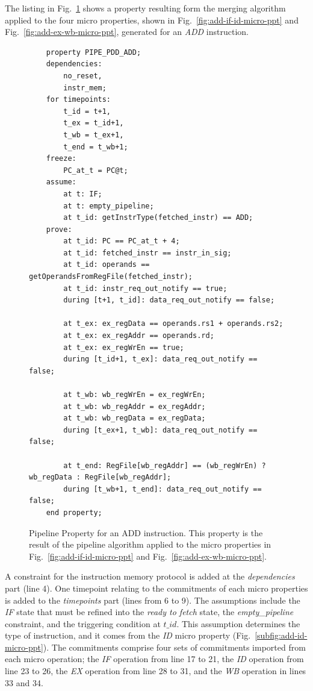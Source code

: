 The listing in Fig.~\ref{fig:add-ptt-merg-algorithm} shows a property resulting form the merging algorithm applied to the four micro properties, shown in Fig.~\ref{fig:add-if-id-micro-ppt} and Fig.~\ref{fig:add-ex-wb-micro-ppt}, generated for an \textit{ADD} instruction.

\begin{figure}[htb!]
    \begin{lstlisting}
    property PIPE_PDD_ADD;
    dependencies: 
        no_reset,
        instr_mem;
    for timepoints:
        t_id = t+1,
        t_ex = t_id+1,
        t_wb = t_ex+1,
        t_end = t_wb+1;
    freeze:
        PC_at_t = PC@t;
    assume:
        at t: IF;
        at t: empty_pipeline;
        at t_id: getInstrType(fetched_instr) == ADD;
    prove:
        at t_id: PC == PC_at_t + 4;
        at t_id: fetched_instr == instr_in_sig;
        at t_id: operands == getOperandsFromRegFile(fetched_instr);
        at t_id: instr_req_out_notify == true;
        during [t+1, t_id]: data_req_out_notify == false;
    
        at t_ex: ex_regData == operands.rs1 + operands.rs2;
        at t_ex: ex_regAddr == operands.rd;
        at t_ex: ex_regWrEn == true;
        during [t_id+1, t_ex]: data_req_out_notify == false;
    
        at t_wb: wb_regWrEn = ex_regWrEn;
        at t_wb: wb_regAddr = ex_regAddr;
        at t_wb: wb_regData = ex_regData;
        during [t_ex+1, t_wb]: data_req_out_notify == false;
    
        at t_end: RegFile[wb_regAddr] == (wb_regWrEn) ? wb_regData : RegFile[wb_regAddr];
        during [t_wb+1, t_end]: data_req_out_notify == false;
    end property;\end{lstlisting}
    \caption{Pipeline Property for an ADD instruction. This property is the result of the pipeline algorithm applied to the micro properties in Fig.~\ref{fig:add-if-id-micro-ppt} and Fig.~\ref{fig:add-ex-wb-micro-ppt}.}
    \label{fig:add-ptt-merg-algorithm}
\end{figure}

A constraint for the instruction memory protocol is added at the \textit{dependencies} part (line 4). One timepoint relating to the commitments of each micro properties is added to the \textit{timepoints} part (lines from 6 to 9). The assumptions include the \textit{IF} state that must be refined into the \textit{ready to fetch} state, the \textit{empty\_pipeline} constraint, and the triggering condition at $t\_id$. This assumption determines the type of instruction, and it comes from the \textit{ID} micro property (Fig.~\ref{subfig:add-id-micro-ppt}). The commitments comprise four sets of commitments imported from each micro operation; the \textit{IF} operation from line 17 to 21, the \textit{ID} operation from line 23 to 26, the \textit{EX} operation from line 28 to 31, and the \textit{WB} operation in lines 33 and 34.

